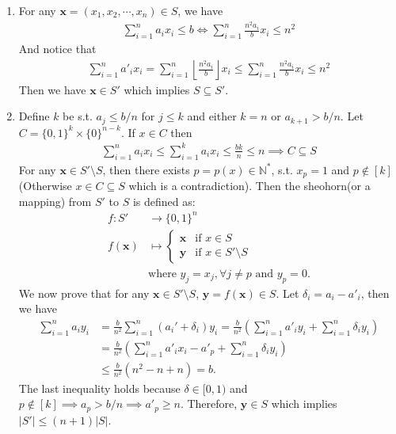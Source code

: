 \begin{answer}
    \begin{enumerate}[label=\alph*).]
        \item For any $\bm x = (x_1, x_2, \cdots, x_n) \in S$, we have 
        \begin{align*}
            \sum_{i=1}^{n} a_i x_i \le b \iff \sum_{i=1}^{n} \frac{n^2 a_i}{b} x_i \le n^2 
        \end{align*}
        And notice that
        \begin{align*}
            \sum_{i=1}^{n} a'_i x_i = \sum_{i=1}^{n} \left\lfloor\frac{n^2 a_i}{b}\right\rfloor x_i \le \sum_{i=1}^{n} \frac{n^2 a_i}{b} x_i \le n^2
        \end{align*}
        Then we have $\bm x \in S'$ which implies $S \subseteq S'$.
        \item Define $k$ be s.t. $ a_j \le b/n$ for $j \le k$ and either $k = n$ or $a_{k+1} > b/n$. Let $C = \{0,1\}^k \times \{0\}^{n-k}$. 
        If $x \in C$ then 
        \begin{align*}
            \sum_{i=1}^{n} a_i x_i \le \sum_{i=1}^{k} a_i x_i \le\frac{bk}{n}  \le n \implies C \subseteq S
        \end{align*}
        For any $\bm x \in S'\setminus S$, then there exists $p = p(x) \in \mathbb{N}^*$, s.t. $x_p = 1$ and $p \notin [k]$ (Otherwise $x \in C \subseteq S$ which is a contradiction).
        Then the sheohorn(or a mapping) from $S'$ to $S$ is defined as:
        \begin{align*}
            f: S' &\to \{0,1\}^n \\
            f(\bm x) &\mapsto \begin{cases}
                \bm x & \text{if } x \in S \\
                \bm y & \text{if } x \in S' \setminus S 
            \end{cases} \\
            &\text{where }  y_j = x_j, \forall j \ne p \text{ and } y_p = 0.
        \end{align*}
        We now prove that for any $\bm x \in S'\setminus S$, $\bm y = f(\bm x) \in S$. Let $\delta_i = a_i - a'_i$, then we have
        \begin{align*}
            \sum_{i=1}^{n} a_i y_i &= \frac{b}{n^2} \sum_{i=1}^{n} (a_i' + \delta_i) y_i = \frac{b}{n^2} \left(\sum_{i=1}^{n} a'_i y_i + \sum_{i=1}^{n}\delta_i y_i \right) \\
            &= \frac{b}{n^2} \left(\sum_{i=1}^{n} a'_i x_i - a'_p + \sum_{i=1}^{n}\delta_i y_i \right) \\
            &\le \frac{b}{n^2} (n^2 - n + n)  = b.
        \end{align*}
        The last inequality holds because $\delta \in [0, 1)$ and $p \notin [k] \implies a_p > b/n \implies a'_p \ge n$. Therefore, $\bm y \in S$ which implies $|S'| \le (n+1)|S|$.


\end{enumerate}
\end{answer}
